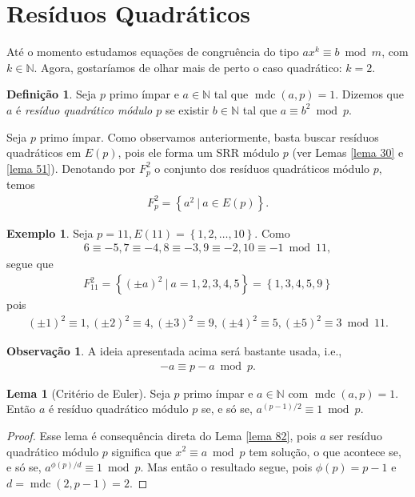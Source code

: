 \documentclass[a4paper,11pt,twoside, leqno]{article}
\DeclareMathOperator{\mdc}{mdc}
\theoremstyle{definition}
\newtheorem*{definition}{Definição}
\newtheorem{lemma}[theorem]{Lema}
\newtheorem{remark}{Observação}[section]
\newtheorem*{example}{Exemplo}
\begin{document}
\section{Resíduos Quadráticos}
\hspace{12pt} Até o momento estudamos equações de congruência do tipo $ax^k\equiv b\bmod m$, com $k\in\mathbb{N}$. Agora, gostaríamos de olhar mais de perto o caso quadrático: $k=2$.
\begin{definition}
	Seja $p$ primo ímpar e $a\in\mathbb{N}$ tal que $\mdc(a,p) = 1$. Dizemos que $a$ é {\em resíduo quadrático módulo $p$} se existir $b\in\mathbb{N}$ tal que $a\equiv b^2\bmod p$.
\end{definition}
\hspace{12pt} Seja $p$ primo ímpar. Como observamos anteriormente, basta buscar resíduos quadráticos em $E(p)$, pois ele forma um SRR módulo $p$ (ver Lemas \eqref{lema 30} e \eqref{lema 51}). Denotando por $F_p^2$ o conjunto dos resíduos quadráticos módulo $p$, temos
\begin{align*}
F_p^2 = \left\{ a^2\ | \ a\in E(p) \right\}.
\end{align*}
\begin{example}
	Seja $p=11, E(11) = \left\{ 1,2,\dots,10 \right\}$. Como 
	\begin{align*}
	6\equiv -5, 7\equiv -4, 8\equiv -3, 9\equiv -2, 10\equiv -1\bmod 11,
	\end{align*}
	segue que
	\begin{align*}
	F_{11}^2 = \left\{ (\pm a)^2 \ | \ a = 1,2,3,4,5 \right\} = \left\{ 1,3,4,5,9 \right\}
	\end{align*}
	pois
	\begin{align*}
	(\pm 1)^2\equiv 1, (\pm 2)^2\equiv 4, (\pm 3)^2\equiv 9, (\pm 4)^2\equiv 5, (\pm 5)^2\equiv 3\bmod 11.
	\end{align*}
\end{example}
\begin{remark}
	A ideia apresentada acima será bastante usada, i.e., 
	\begin{align*}
	-a\equiv p-a\bmod p.
	\end{align*}
\end{remark}
\begin{lemma}[Critério de Euler]
	\label{lema 84} 
	Seja $p$ primo ímpar e $a\in\mathbb{N}$ com $\mdc(a,p) = 1$. Então $a$ é resíduo quadrático módulo $p$ se, e só se, $a^{(p-1)/2}\equiv 1\bmod p$.
\end{lemma}
\begin{proof}
	Esse lema é consequência direta do Lema \eqref{lema 82}, pois $a$ ser resíduo quadrático módulo $p$ significa que $x^2\equiv a\bmod p$ tem solução, o que acontece se, e só se, $a^{\phi(p)/d}\equiv 1\bmod p$. Mas então o resultado segue, pois $\phi(p) = p-1$ e $d = \mdc(2,p-1) = 2$.
\end{proof}
\end{document}
